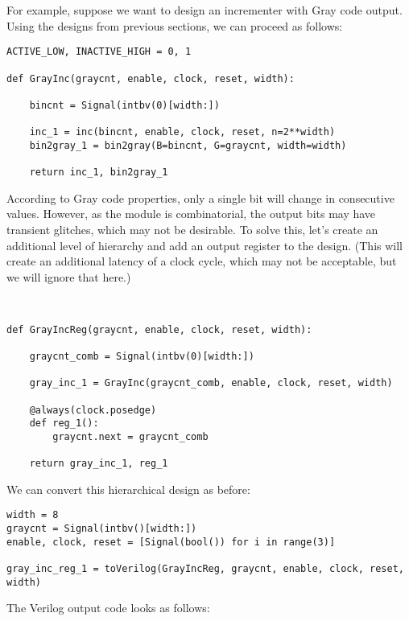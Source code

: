 For example, suppose we want to design an
incrementer with Gray code output. Using the
designs from previous sections, we can proceed
as follows:

\begin{verbatim}
ACTIVE_LOW, INACTIVE_HIGH = 0, 1

def GrayInc(graycnt, enable, clock, reset, width):
    
    bincnt = Signal(intbv(0)[width:])
    
    inc_1 = inc(bincnt, enable, clock, reset, n=2**width)
    bin2gray_1 = bin2gray(B=bincnt, G=graycnt, width=width)
    
    return inc_1, bin2gray_1
\end{verbatim}

According to Gray code properties, only a single bit
will change in consecutive values. However, as the
 module is combinatorial, the output bits
may have transient glitches, which may not be desirable.
To solve this, let's create an additional level of
hierarchy and add an output register to the design.
(This will create an additional latency of a clock
cycle, which may not be acceptable, but we will
ignore that here.)

\begin{verbatim}


def GrayIncReg(graycnt, enable, clock, reset, width):
    
    graycnt_comb = Signal(intbv(0)[width:])
    
    gray_inc_1 = GrayInc(graycnt_comb, enable, clock, reset, width)

    @always(clock.posedge)
    def reg_1():
        graycnt.next = graycnt_comb
    
    return gray_inc_1, reg_1
\end{verbatim}

We can convert this hierarchical design as before:

\begin{verbatim}
width = 8
graycnt = Signal(intbv()[width:])
enable, clock, reset = [Signal(bool()) for i in range(3)]

gray_inc_reg_1 = toVerilog(GrayIncReg, graycnt, enable, clock, reset, width)
\end{verbatim}

The Verilog output code looks as follows:

